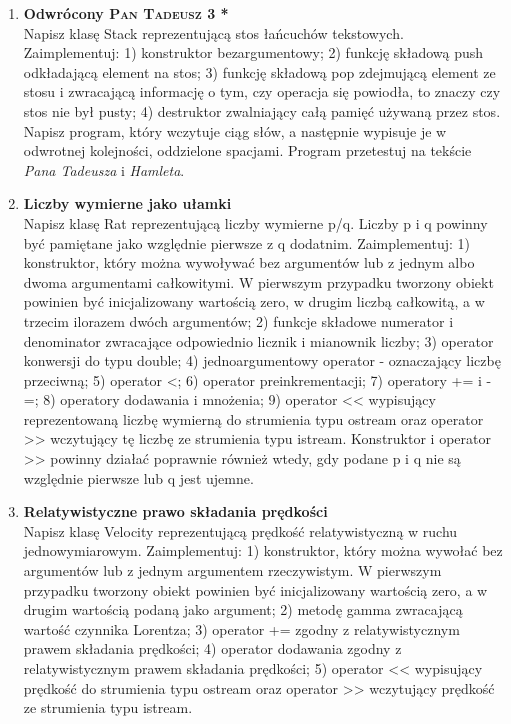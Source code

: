 \documentclass[12pt]{article}
\begin{document}
\begin{enumerate}
\item \textbf{Odwrócony \textsc{Pan Tadeusz} 3 *}\\
Napisz klasę \textsf{Stack} reprezentującą stos łańcuchów tekstowych. Zaimplementuj: 1) konstruktor bezargumentowy; 2) funkcję składową \textsf{push} odkładającą element na stos; 3) funkcję składową \textsf{pop} zdejmującą element ze stosu i zwracającą informację o tym, czy operacja się powiodła, to znaczy czy stos nie był pusty; 4) destruktor zwalniający całą pamięć używaną przez stos. Napisz program, który wczytuje ciąg słów, a następnie wypisuje je w odwrotnej kolejności, oddzielone spacjami. Program przetestuj na tekście \textit{Pana Tadeusza} i \textit{Hamleta}.


\newpage
{}

\item \textbf{Liczby wymierne jako ułamki}\\
Napisz klasę \textsf{Rat} reprezentującą liczby wymierne \textsf{p/q}. Liczby \textsf{p} i \textsf{q} powinny być pamiętane jako względnie pierwsze z \textsf{q} dodatnim. Zaimplementuj: 1) konstruktor, który można wywoływać bez argumentów lub z jednym albo dwoma argumentami całkowitymi. W pierwszym przypadku tworzony obiekt powinien być inicjalizowany wartością zero, w drugim liczbą całkowitą, a w trzecim ilorazem dwóch argumentów; 2) funkcje składowe \textsf{numerator} i \textsf{denominator} zwracające odpowiednio licznik i mianownik liczby; 3) operator konwersji do typu \textsf{double}; 4) jednoargumentowy operator \textsf{-} oznaczający liczbę przeciwną; 5) operator \textsf{<}; 6) operator preinkrementacji; 7) operatory \textsf{+=} i \textsf{-=}; 8) operatory dodawania i mnożenia; 9) operator \textsf{<<} wypisujący reprezentowaną liczbę wymierną do strumienia typu \textsf{ostream} oraz operator \textsf{>>} wczytujący tę liczbę ze strumienia typu \textsf{istream}. Konstruktor i operator \textsf{>>} powinny działać poprawnie również wtedy, gdy podane \textsf{p} i \textsf{q} nie są względnie pierwsze lub \textsf{q} jest ujemne.

\item \textbf{Relatywistyczne prawo składania prędkości}\\
Napisz klasę \textsf{Velocity} reprezentującą prędkość relatywistyczną w ruchu jednowymiarowym. Zaimplementuj: 1) konstruktor, który można wywołać bez argumentów lub z jednym argumentem rzeczywistym. W pierwszym przypadku tworzony obiekt powinien być inicjalizowany wartością zero, a w drugim wartością podaną jako argument; 2) metodę \textsf{gamma} zwracającą wartość czynnika Lorentza; 3) operator \textsf{+=} zgodny z relatywistycznym prawem składania prędkości; 4) operator dodawania zgodny z relatywistycznym prawem składania prędkości; 5) operator \textsf{<<} wypisujący prędkość do strumienia typu \textsf{ostream} oraz operator \textsf{>>} wczytujący prędkość ze strumienia typu \textsf{istream}.


\end{enumerate}
\end{document}
